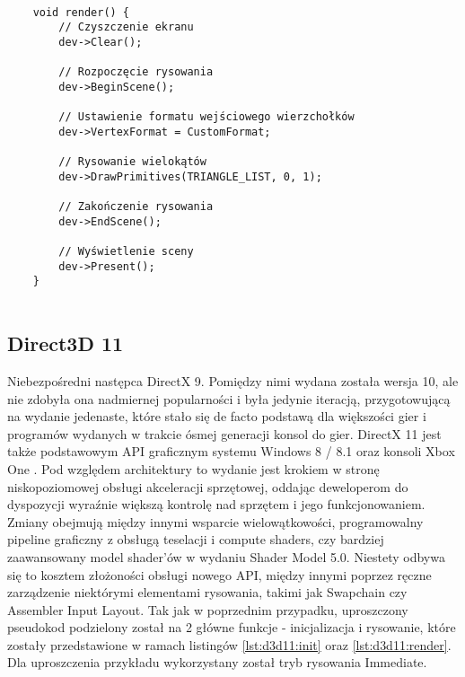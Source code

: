 \begin{lstlisting}[caption={Funkcja rysowania przy pomocy Managed DirectX}, label={lst:manageddx:drawing}]
	
	void render() {
		// Czyszczenie ekranu
		dev->Clear();
		
		// Rozpoczęcie rysowania
		dev->BeginScene();
		
		// Ustawienie formatu wejściowego wierzchołków
		dev->VertexFormat = CustomFormat;
		
		// Rysowanie wielokątów
		dev->DrawPrimitives(TRIANGLE_LIST, 0, 1);
		
		// Zakończenie rysowania
		dev->EndScene();
		
		// Wyświetlenie sceny
		dev->Present();
	}
	
\end{lstlisting}

\subsection{Direct3D 11}

Niebezpośredni następca DirectX 9. Pomiędzy nimi wydana została wersja
10, ale nie zdobyła ona nadmiernej popularności i była jedynie iteracją,
przygotowującą na wydanie jedenaste, które stało się de facto podstawą
dla większości gier i programów wydanych w trakcie ósmej generacji
konsol do gier. DirectX 11 jest także podstawowym API graficznym systemu
Windows 8 / 8.1 oraz konsoli Xbox One \cite{ms:raisingbar:2024}. Pod względem architektury to wydanie jest krokiem w stronę
niskopoziomowej obsługi akceleracji sprzętowej, oddając deweloperom do
dyspozycji wyraźnie większą kontrolę nad sprzętem i jego
funkcjonowaniem. Zmiany obejmują między innymi wsparcie wielowątkowości,
programowalny pipeline graficzny z obsługą teselacji i compute shaders,
czy bardziej zaawansowany model shader'ów w wydaniu Shader Model 5.0. Niestety odbywa się to kosztem złożoności obsługi nowego API, między
innymi poprzez ręczne zarządzenie niektórymi elementami rysowania,
takimi jak Swapchain czy Assembler Input Layout. Tak jak w poprzednim przypadku, uproszczony pseudokod podzielony został
na 2 główne funkcje - inicjalizacja i rysowanie, które zostały przedstawione w ramach listingów \ref{lst:d3d11:init} oraz \ref{lst:d3d11:render}. Dla uproszczenia przykładu wykorzystany został tryb rysowania Immediate.

